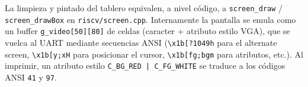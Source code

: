 La limpieza y pintado del tablero equivalen, a nivel código, a \texttt{screen\_draw} / \texttt{screen\_drawBox} en
\texttt{riscv/screen.cpp}. Internamente la pantalla se emula como un buffer \texttt{g\_video[50][80]} de celdas
(caracter + atributo estilo VGA), que se vuelca al UART mediante secuencias ANSI (\texttt{\textbackslash x1b[?1049h}
para el alternate screen, \texttt{\textbackslash x1b[y;xH} para posicionar el cursor, \texttt{\textbackslash x1b[fg;bgm}
para atributos, etc.). Al imprimir, un atributo estilo \texttt{C\_BG\_RED | C\_FG\_WHITE} se traduce a los códigos ANSI
\texttt{41} y \texttt{97}.
